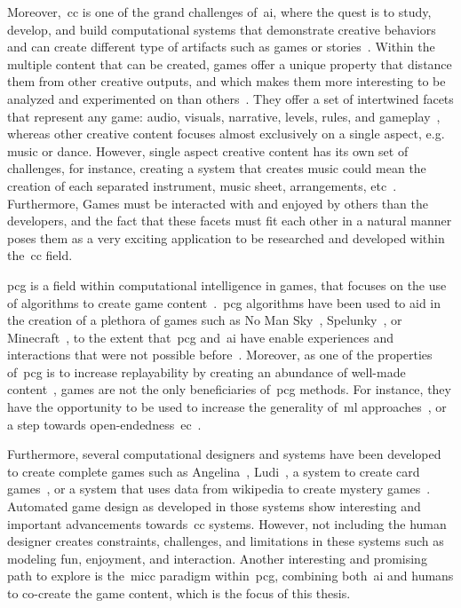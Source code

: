 Moreover,~\acrfull{cc} is one of the grand challenges of~\acrshort{ai}, where the quest is to study, develop, and build computational systems that demonstrate creative behaviors and can create different type of artifacts such as games or stories~\cite{Colton2012-CC}. Within the multiple content that can be created, games offer a unique property that distance them from other creative outputs, and which makes them more interesting to be analyzed and experimented on than others~\cite{Liapis2014-gameCreativity}. They offer a set of intertwined facets that represent any game: audio, visuals, narrative, levels, rules, and gameplay~\cite{Liapis2019-OrchestratingGames}, whereas other creative content focuses almost exclusively on a single aspect, e.g. music or dance. However, single aspect creative content has its own set of challenges, for instance, creating a system that creates music could mean the creation of each separated instrument, music sheet, arrangements, etc~\cite{HooverPhD}. Furthermore, Games must be interacted with and enjoyed by others than the developers, and the fact that these facets must fit each other in a natural manner poses them as a very exciting application to be researched and developed within the~\acrshort{cc} field.

\acrfull{pcg} is a field within computational intelligence in games, that focuses on the use of algorithms to create game content~\cite{Yannakakis2018}.~\acrshort{pcg} algorithms have been used to aid in the creation of a plethora of games such as No Man Sky~\cite{nomansky}, Spelunky~\cite{spelunky}, or Minecraft~\cite{minecraft}, to the extent that~\acrshort{pcg} and~\acrshort{ai} have enable experiences and interactions that were not possible before~\cite{aidungeon,rogue,elite}. Moreover, as one of the properties of~\acrshort{pcg} is to increase replayability by creating an abundance of well-made content~\cite{shaker_procedural_2016}, games are not the only beneficiaries of~\acrshort{pcg} methods. For instance, they have the opportunity to be used to increase the generality of~\acrfull{ml} approaches~\cite{Risi2020-pcgGeneralityML}, or a step towards open-endedness~\acrfull{ec}~\cite{clune2019-aigas}. 


Furthermore, several computational designers and systems have been developed to create complete games such as Angelina~\cite{Cook2016-Angelina1}, Ludi~\cite{Browne2010-ludii}, a system to create card games~\cite{font2013-GenCardGames}, or a system that uses data from wikipedia to create mystery games~\cite{barros2018-DATAeinstein}. Automated game design as developed in those systems show interesting and important advancements towards~\acrshort{cc} systems. However, not including the human designer creates constraints, challenges, and limitations in these systems such as modeling fun, enjoyment, and interaction. Another interesting and promising path to explore is the~\acrlong{micc} paradigm within~\acrshort{pcg}, combining both~\acrshort{ai} and humans to co-create the game content, which is the focus of this thesis.

